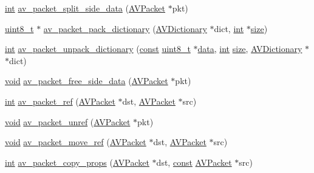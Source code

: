 \begin{DoxyCompactItemize}
\item 
\hyperlink{xmltok_8h_a5a0d4a5641ce434f1d23533f2b2e6653}{int} \hyperlink{group__lavc__packet_ga7febd324eb8a1109e74416e9c82045b1}{av\+\_\+packet\+\_\+split\+\_\+side\+\_\+data} (\hyperlink{struct_a_v_packet}{A\+V\+Packet} $\ast$pkt)
\item 
\hyperlink{lib-src_2ffmpeg_2win32_2stdint_8h_a9a941819355e6f658991890ff66b4b0e}{uint8\+\_\+t} $\ast$ \hyperlink{group__lavc__packet_ga7a0673855be71c876334ed04c6989ae8}{av\+\_\+packet\+\_\+pack\+\_\+dictionary} (\hyperlink{group__lavu__dict_ga1d7cc0833bee918994a600556410315f}{A\+V\+Dictionary} $\ast$dict, \hyperlink{xmltok_8h_a5a0d4a5641ce434f1d23533f2b2e6653}{int} $\ast$\hyperlink{group__lavu__mem_ga854352f53b148adc24983a58a1866d66}{size})
\item 
\hyperlink{xmltok_8h_a5a0d4a5641ce434f1d23533f2b2e6653}{int} \hyperlink{group__lavc__packet_ga1db169cc19e8194eca7311f877783a50}{av\+\_\+packet\+\_\+unpack\+\_\+dictionary} (\hyperlink{getopt1_8c_a2c212835823e3c54a8ab6d95c652660e}{const} \hyperlink{lib-src_2ffmpeg_2win32_2stdint_8h_a9a941819355e6f658991890ff66b4b0e}{uint8\+\_\+t} $\ast$\hyperlink{lib_2expat_8h_ac39e72a1de1cb50dbdc54b08d0432a24}{data}, \hyperlink{xmltok_8h_a5a0d4a5641ce434f1d23533f2b2e6653}{int} \hyperlink{group__lavu__mem_ga854352f53b148adc24983a58a1866d66}{size}, \hyperlink{group__lavu__dict_ga1d7cc0833bee918994a600556410315f}{A\+V\+Dictionary} $\ast$$\ast$dict)
\item 
\hyperlink{sound_8c_ae35f5844602719cf66324f4de2a658b3}{void} \hyperlink{group__lavc__packet_ga5cf4ba712aca9b300daf1eea1b8a9ebb}{av\+\_\+packet\+\_\+free\+\_\+side\+\_\+data} (\hyperlink{struct_a_v_packet}{A\+V\+Packet} $\ast$pkt)
\item 
\hyperlink{xmltok_8h_a5a0d4a5641ce434f1d23533f2b2e6653}{int} \hyperlink{group__lavc__packet_gaec4e65b9bc4f37a15958d10e79028bf9}{av\+\_\+packet\+\_\+ref} (\hyperlink{struct_a_v_packet}{A\+V\+Packet} $\ast$dst, \hyperlink{struct_a_v_packet}{A\+V\+Packet} $\ast$src)
\item 
\hyperlink{sound_8c_ae35f5844602719cf66324f4de2a658b3}{void} \hyperlink{group__lavc__packet_ga63d5a489b419bd5d45cfd09091cbcbc2}{av\+\_\+packet\+\_\+unref} (\hyperlink{struct_a_v_packet}{A\+V\+Packet} $\ast$pkt)
\item 
\hyperlink{sound_8c_ae35f5844602719cf66324f4de2a658b3}{void} \hyperlink{group__lavc__packet_ga91dbb1359f99547adb544ee96a406b21}{av\+\_\+packet\+\_\+move\+\_\+ref} (\hyperlink{struct_a_v_packet}{A\+V\+Packet} $\ast$dst, \hyperlink{struct_a_v_packet}{A\+V\+Packet} $\ast$src)
\item 
\hyperlink{xmltok_8h_a5a0d4a5641ce434f1d23533f2b2e6653}{int} \hyperlink{group__lavc__packet_gade00f67930f4e2a3401b67b701d5b3a2}{av\+\_\+packet\+\_\+copy\+\_\+props} (\hyperlink{struct_a_v_packet}{A\+V\+Packet} $\ast$dst, \hyperlink{getopt1_8c_a2c212835823e3c54a8ab6d95c652660e}{const} \hyperlink{struct_a_v_packet}{A\+V\+Packet} $\ast$src)
\end{DoxyCompactItemize}


